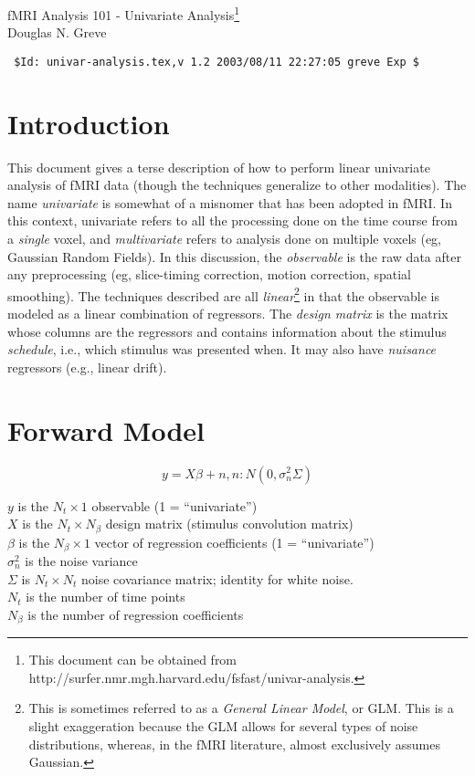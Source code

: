 \documentclass{article}
\begin{document}
\begin{LARGE}
\begin{center}
fMRI Analysis 101 - Univariate Analysis\footnote{This document can be
obtained from http://surfer.nmr.mgh.harvard.edu/fsfast/univar-analysis.}\\
Douglas N. Greve\\
\end{center}
\end{LARGE}
\begin{verbatim}
 $Id: univar-analysis.tex,v 1.2 2003/08/11 22:27:05 greve Exp $
\end{verbatim}

\section{Introduction}

This document gives a terse description of how to perform linear
univariate analysis of fMRI data (though the techniques generalize to
other modalities). The name {\em univariate} is somewhat of a misnomer
that has been adopted in fMRI.  In this context, univariate refers to
all the processing done on the time course from a {\em single} voxel,
and {\em multivariate} refers to analysis done on multiple voxels (eg,
Gaussian Random Fields). In this discussion, the {\em observable} is
the raw data after any preprocessing (eg, slice-timing correction,
motion correction, spatial smoothing). The techniques described are
all {\em linear}\footnote{This is sometimes referred to as a {\em
General Linear Model}, or GLM. This is a slight exaggeration because
the GLM allows for several types of noise distributions, whereas, in
the fMRI literature, almost exclusively assumes Gaussian.} in that the
observable is modeled as a linear combination of regressors. The {\em
design matrix} is the matrix whose columns are the regressors and
contains information about the stimulus {\em schedule}, i.e., which
stimulus was presented when. It may also have {\em nuisance}
regressors (e.g., linear drift).

\section{Forward Model}

\begin{equation}
y = X \beta + n, n: N(0,\sigma_n^2 \Sigma)
\end{equation}

\noindent
$y$ is the $N_t \times 1$ observable (1 = ``univariate'')\\
$X$ is the $N_t \times N_\beta$ design matrix (stimulus convolution matrix) \\
$\beta$ is the $N_\beta \times 1$ vector of regression coefficients (1 = ``univariate'')\\
$\sigma_n^2$ is the noise variance \\
$\Sigma$ is $N_t \times N_t$ noise covariance matrix; identity for
white noise.\\
$N_t$ is the number of time points\\
$N_\beta$ is the number of regression coefficients\\
\end{document}
